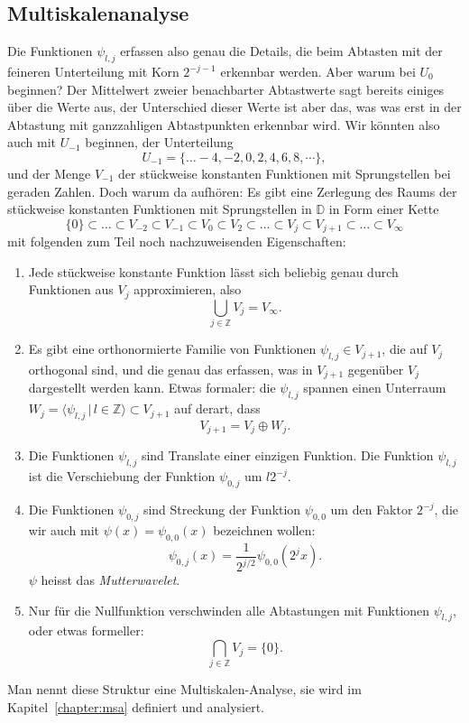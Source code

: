 \subsection{Multiskalenanalyse}
Die Funktionen $\psi_{l,j}$ erfassen also genau die Details, die beim
Abtasten mit der feineren Unterteilung mit Korn $2^{-j-1}$ erkennbar
werden.
Aber warum bei $U_0$ beginnen?
Der Mittelwert zweier benachbarter Abtastwerte sagt bereits einiges
über die Werte aus, der Unterschied dieser Werte ist aber das, was
was erst in der Abtastung mit ganzzahligen Abtastpunkten erkennbar wird.
Wir könnten also auch mit $U_{-1}$ beginnen, der Unterteilung
\[
U_{-1} = \{\dots -4,-2,0,2,4,6,8,\cdots\},
\]
und der Menge $V_{-1}$ der stückweise konstanten Funktionen mit
Sprungstellen bei geraden Zahlen.
Doch warum da aufhören: Es gibt eine Zerlegung des Raums der stückweise
konstanten Funktionen mit Sprungstellen in $\mathbb D$ in Form einer
Kette
\begin{equation}
\{0\}
\subset
\dots
\subset
V_{-2}\subset V_{-1} \subset V_{0} \subset V_{2} \subset\dots\subset
V_j \subset V_{j+1}\subset\dots \subset V_{\infty}
\label{haar:kette}
\end{equation}
mit folgenden zum Teil noch nachzuweisenden Eigenschaften:
\begin{enumerate}
\item
Jede stückweise konstante Funktion lässt sich beliebig genau
durch Funktionen aus $V_j$ approximieren, also
\[
\bigcup_{j\in\mathbb Z} V_j = V_\infty.
\]
\item
Es gibt eine orthonormierte Familie von Funktionen $\psi_{l,j}\in V_{j+1}$,
die auf $V_j$ orthogonal sind, und die genau das erfassen, was in $V_{j+1}$
gegenüber $V_j$ dargestellt werden kann.
Etwas formaler: die $\psi_{l,j}$ spannen einen Unterraum
$W_{j} = \langle \psi_{l,j}\,|\, l\in\mathbb Z\rangle \subset V_{j+1}$
auf derart, dass
\[
V_{j+1} = V_j \oplus W_j.
\]
\item 
Die Funktionen $\psi_{l,j}$ sind Translate einer einzigen Funktion.
Die Funktion $\psi_{l,j}$ ist die Verschiebung der Funktion $\psi_{0,j}$ 
um $l2^{-j}$.
\item
Die Funktionen $\psi_{0,j}$ sind Streckung der Funktion
$\psi_{0,0}$ um den Faktor $2^{-j}$, die wir auch mit
$\psi(x)=\psi_{0,0}(x)$ bezeichnen wollen:
\[
\psi_{0,j}(x) = \frac1{2^{j/2}}\psi_{0,0}(2^jx).
\]
$\psi$ heisst das {\em Mutterwavelet}.
\item 
Nur für die Nullfunktion verschwinden alle Abtastungen mit Funktionen
$\psi_{l,j}$, oder etwas formeller:
\[
\bigcap_{j\in\mathbb Z} V_j
=
\{0\}.
\]
\end{enumerate}
Man nennt diese Struktur eine Multiskalen-Analyse, sie wird im
Kapitel~\ref{chapter:msa} definiert und analysiert.

